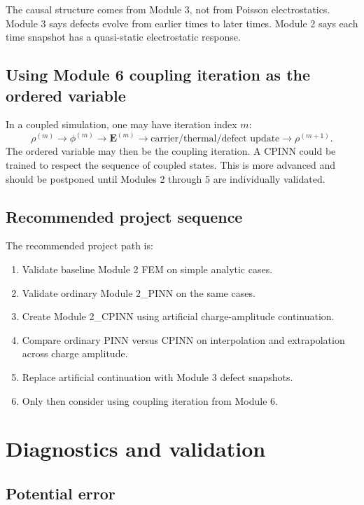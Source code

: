 \documentclass[11pt]{article}
\newcommand{\Evec}{\mathbf{E}}
\begin{document}
The causal structure comes from Module 3, not from Poisson electrostatics. Module 3 says defects evolve from earlier times to later times. Module 2 says each time snapshot has a quasi-static electrostatic response.

\subsection{Using Module 6 coupling iteration as the ordered variable}

In a coupled simulation, one may have iteration index $m$:
\begin{equation}
\rho^{(m)} \rightarrow \phi^{(m)} \rightarrow \Evec^{(m)} \rightarrow \text{carrier/thermal/defect update} \rightarrow \rho^{(m+1)}.
\end{equation}
The ordered variable may then be the coupling iteration. A CPINN could be trained to respect the sequence of coupled states. This is more advanced and should be postponed until Modules 2 through 5 are individually validated.

\subsection{Recommended project sequence}

The recommended project path is:
\begin{enumerate}[leftmargin=2em]
\item Validate baseline Module 2 FEM on simple analytic cases.
\item Validate ordinary Module 2\_PINN on the same cases.
\item Create Module 2\_CPINN using artificial charge-amplitude continuation.
\item Compare ordinary PINN versus CPINN on interpolation and extrapolation across charge amplitude.
\item Replace artificial continuation with Module 3 defect snapshots.
\item Only then consider using coupling iteration from Module 6.
\end{enumerate}

\section{Diagnostics and validation}

\subsection{Potential error}
\end{document}
